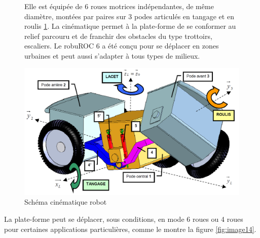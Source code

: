 \begin{figure}[htbp]
\begin{minipage}[c]{.4\linewidth}
Elle est équipée de 6 roues motrices indépendantes, de même diamètre, montées par paires sur 3 podes articulés en tangage et en roulis \ref{fig:image13}. La cinématique permet à la plate-forme de se conformer au relief parcouru et de franchir des obstacles du type trottoirs, escaliers. Le robuROC 6 a été conçu pour se déplacer en zones urbaines et peut aussi s'adapter à tous types de milieux.  
\end{minipage}
\hfill
\begin{minipage}[c]{.55\linewidth}
\begin{center}
\includegraphics[width=\linewidth]{img/Robot_cin.png}
\caption{Schéma cinématique robot}
\label{fig:image13}
\end{center}
\end{minipage}
\end{figure}

La plate-forme peut se déplacer, sous conditions, en mode 6 roues ou 4 roues pour certaines applications particulières, comme le montre la figure \ref{fig:image14}.

